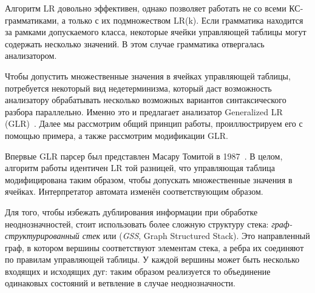 Алгоритм LR довольно эффективен, однако позволяет работать не со всеми КС-грамматиками, а только с их подмножеством LR(k). Если грамматика находится за рамками допускаемого класса, некоторые ячейки управляющей таблицы могут содержать несколько значений. В этом случае грамматика отвергалась анализатором.

Чтобы допустить множественные значения в ячейках управляющей таблицы, потребуется некоторый вид недетерминизма, который даст возможность анализатору обрабатывать несколько возможных вариантов синтаксического разбора параллельно. Именно это и предлагает анализатор Generalized LR (GLR)~\cite{tomita-1987-efficient}. Далее мы рассмотрим общий принцип работы, проиллюстрируем его с помощью примера, а также рассмотрим модификации GLR.

Впервые GLR парсер был представлен Масару Томитой в 1987~\cite{tomita-1987-efficient}. В целом, алгоритм работы идентичен LR той разницей, что управляющая таблица модифицирована таким образом, чтобы допускать множественные значения в ячейках. Интерпретатор автомата изменён соответствующим образом.

Для того, чтобы избежать дублирования информации при обработке неоднозначностей, стоит использовать более сложную структуру стека: \textit{граф-структурированный стек} или (\textit{GSS}, Graph Structured Stack). Это направленный граф, в котором вершины соответствуют элементам стека, а ребра их соединяют по правилам управляющей таблицы. У каждой вершины может быть несколько входящих и исходящих дуг: таким образом реализуется то объединение одинаковых состояний и ветвление в случае неоднозначности.

